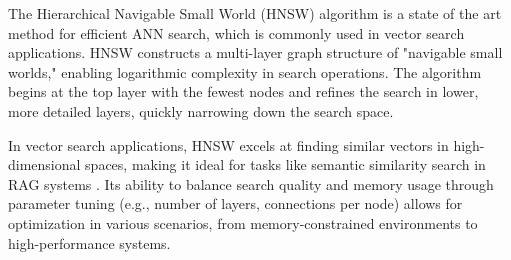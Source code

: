 \documentclass[a4paper, oneside]{discothesis}
\begin{document}
The Hierarchical Navigable Small World (HNSW) algorithm \cite{malkov2018efficient} is a state of the art method for efficient ANN search, which is commonly used in vector search applications. HNSW constructs a multi-layer graph structure of "navigable small worlds," enabling logarithmic complexity in search operations. The algorithm begins at the top layer with the fewest nodes and refines the search in lower, more detailed layers, quickly narrowing down the search space.

In vector search applications, HNSW excels at finding similar vectors in high-dimensional spaces, making it ideal for tasks like semantic similarity search in RAG systems \cite{johnson2019billion}. Its ability to balance search quality and memory usage through parameter tuning (e.g., number of layers, connections per node) allows for optimization in various scenarios, from memory-constrained environments to high-performance systems.
\end{document}
